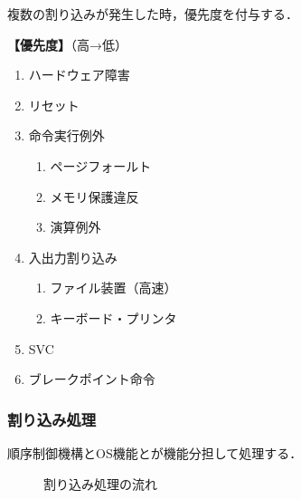 複数の割り込みが発生した時，優先度を付与する．

\noindent\textbf{【優先度】}（高→低）
\begin{enumerate}[label={\color{gray}●}, labelsep=10pt, leftmargin=23pt]
	\item ハードウェア障害
	\item リセット
	\item 命令実行例外
		\begin{enumerate}[label={\color{gray}○}, labelsep=10pt, leftmargin=23pt]
			\item ページフォールト
			\item メモリ保護違反
			\item 演算例外
		\end{enumerate}
	\item 入出力割り込み
		\begin{enumerate}[label={\color{gray}○}, labelsep=10pt, leftmargin=23pt]
			\item ファイル装置（高速）
			\item キーボード・プリンタ
		\end{enumerate}
	\item SVC
	\item ブレークポイント命令
\end{enumerate}



\subsubsection{割り込み処理}\label{sec:com_arch-2-B-6}

順序制御機構とOS機能とが機能分担して処理する．

\begin{figure}[H]
	\begin{center}
		\caption{割り込み処理の流れ}
		\label{fig:com_arch-1}
	\end{center}
\end{figure}

